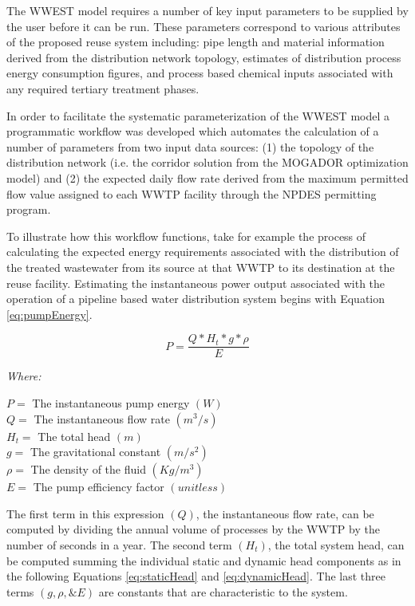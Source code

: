 The WWEST model requires a number of key input parameters to be supplied by the user before it can be run. These parameters correspond to various attributes of the proposed reuse system including: pipe length and material information derived from the distribution network topology, estimates of distribution process energy consumption figures, and process based chemical inputs associated with any required tertiary treatment phases.

In order to facilitate the systematic parameterization of the WWEST model a programmatic workflow was developed which automates the calculation of a number of parameters from two input data sources: (1) the topology of the distribution network (i.e. the corridor solution from the MOGADOR optimization model) and (2) the expected daily flow rate derived from the maximum permitted flow value assigned to each WWTP facility through the NPDES permitting program. 

To illustrate how this workflow functions, take for example the process of calculating the expected energy requirements associated with the distribution of the treated wastewater from its source at that WWTP to its destination at the reuse facility. Estimating the instantaneous power output associated with the operation of a pipeline based water distribution system begins with Equation \ref{eq:pumpEnergy}.

      \begin{equation}
          P = \frac{Q * H_t * g * \rho}{E}
          \label{eq:pumpEnergy}
      \end{equation}
      
       \noindent \textit{Where:} \hfill

       \begin{center}
           $P = $ The instantaneous pump energy $(W)$ \\
           $Q = $ The instantaneous flow rate $(m^{3}/s)$\\
           $H_{t} = $ The total head $(m)$ \\
           $g = $ The gravitational constant $(m/s^{2})$ \\
           $\rho = $ The density of the fluid $(Kg/m^3)$ \\
           $E = $ The pump efficiency factor $(unitless)$ \\
       \end{center}

The first term in this expression $(Q)$, the instantaneous flow rate, can be computed by dividing the annual volume of processes by the WWTP by the number of seconds in a year. The second term $(H_t)$, the total system head, can be computed summing the individual static and dynamic head components as in the following Equations \ref{eq:staticHead} and \ref{eq:dynamicHead}. The last three terms $(g,\rho, \& E)$ are constants that are characteristic to the system.

